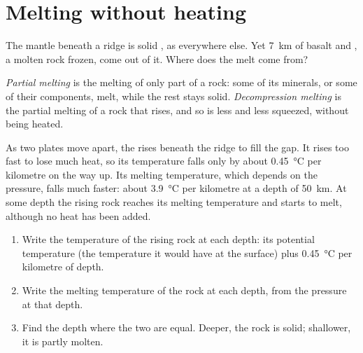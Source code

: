 \section{Melting without heating}

The mantle beneath a ridge is solid , as everywhere else. Yet
\qty{7}{km} of basalt and , a molten rock frozen, come out of it. Where
does the melt come from?

\begin{definition}\label{def:g11:ocean-ridges:partial-melting}
\emph{Partial melting} is the melting of only part
of a rock: some of its minerals, or some of their components, melt, while
the rest stays solid.
\emph{Decompression melting} is the partial melting of a rock that rises, and so is less and
less squeezed, without being heated.
\end{definition}

As two plates move apart, the  rises beneath the ridge to fill
the gap. It rises too fast to lose much heat, so its temperature falls only
by about \qty{0.45}{\celsius} per kilometre on the way up. Its melting
temperature, which depends on the pressure, falls much faster: about
\qty{3.9}{\celsius} per kilometre at a depth of \qty{50}{km}. At some depth
the rising rock reaches its melting temperature and starts to melt, although
no heat has been added.

\begin{method}\label{met:g11:ocean-ridges:melting}
\begin{enumerate}
  \item Write the temperature of the rising rock at each depth: its
        potential temperature (the temperature it would have at the surface)
        plus \qty{0.45}{\celsius} per kilometre of depth.
  \item Write the melting temperature of the rock at each depth, from the
        pressure at that depth.
  \item Find the depth where the two are equal. Deeper, the rock is solid;
        shallower, it is partly molten.
\end{enumerate}
\end{method}

